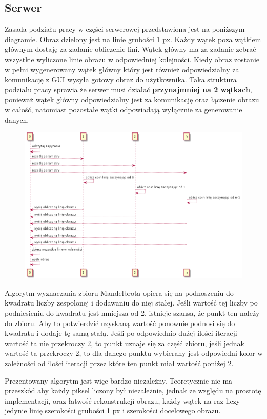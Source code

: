 \subsection{Serwer}
Zasada podziału pracy w części serwerowej przedstawiona jest na poniższym
diagramie. Obraz dzielony jest na linie grubości 1 px. Każdy wątek poza wątkiem
głównym dostaję za zadanie obliczenie lini. Wątek główny ma za zadanie zebrać
wszystkie wyliczone linie obrazu w odpowiedniej kolejności. Kiedy obraz zostanie
w pełni wygenerowany wątek główny który jest również odpowiedzialny za
komunikację z GUI wysyła gotowy obraz do użytkownika. Taka struktura podziału
pracy sprawia że serwer musi działać \textbf{przynajmniej na 2 wątkach},
ponieważ wątek główny odpowiedzialny jest za komunikację oraz łączenie obrazu w
całość, natomiast pozostałe wątki odpowiadają wyłącznie za generowanie danych.
\begin{figure}[H]
    \centering
    \includegraphics[width = \textwidth]{img/watki.png}
\end{figure}

Algorytm wyznaczania zbioru Mandelbrota opiera się na podnoszeniu do kwadratu
liczby zespolonej i dodawaniu do niej stałej. Jeśli wartość tej liczby po
podniesieniu do kwadratu jest mniejsza od 2, istnieje szansa, że punkt ten
należy do zbioru. Aby to potwierdzić uzyskaną wartość ponownie podnosi się do
kwadratu i dodaje tę samą stałą. Jeśli po odpowiednio dużej ilości iteracji
wartość ta nie przekroczy 2, to punkt uznaje się za część zbioru, jeśli jednak
wartość ta przekroczy 2, to dla danego punktu wybierany jest odpowiedni kolor w
zależności od ilości iteracji przez które ten punkt miał wartość poniżej 2.

Prezentowany algorytm jest więc bardzo niezależny. Teoretycznie nie ma przeszkód
aby każdy piksel liczony był niezależnie, jednak ze względu na prostotę
implementacji, oraz łatwość rekonstrukcji obrazu, każdy wątek na raz liczy
jedynie linię szerokości grubości 1 px i szerokości docelowego obrazu.

